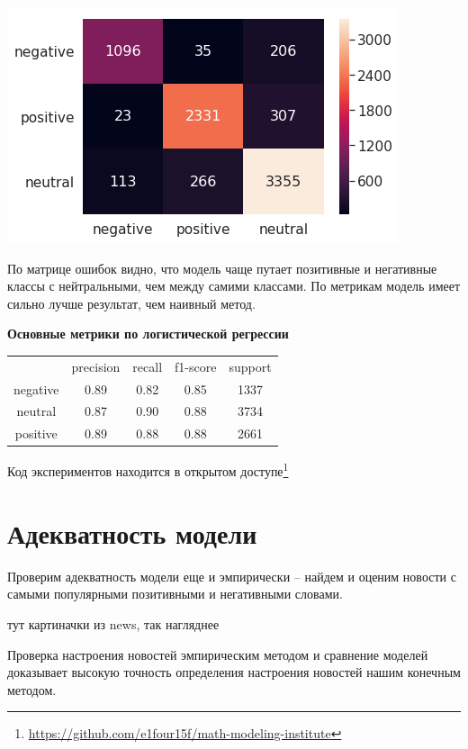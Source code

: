 \documentclass[12pt]{article}
\begin{document}
        \begin{center}
            \includegraphics[scale=0.8]{logreg_heat}
        \end{center}

        По матрице ошибок видно, что модель чаще путает позитивные и негативные классы с нейтральными, 
        чем между самими классами. По метрикам модель имеет сильно лучше результат, чем наивный метод.
        
        \textbf{Основные метрики по логистической регрессии}
        \begin{center}
            \begin{tabular}{ c c c c c}
             & precision & recall & f1-score & support\\ 
             negative & 0.89 & 0.82 & 0.85 & 1337\\ 
             neutral & 0.87 & 0.90 & 0.88 & 3734\\
             positive & 0.89 & 0.88 & 0.88 & 2661
            \end{tabular}
        \end{center}

        Код экспериментов находится в открытом доступе\footnote{\href{https://github.com/e1four15f/math-modeling-institute}{https://github.com/e1four15f/math-modeling-institute}}

    \section{Адекватность модели}
        Проверим адекватность модели еще и эмпирически -- найдем и оценим новости с самыми популярными позитивными и негативными словами.

        тут картиначки из news, так нагляднее

        Проверка настроения новостей эмпирическим методом и сравнение моделей доказывает высокую точность определения настроения новостей нашим конечным методом.
\end{document}
